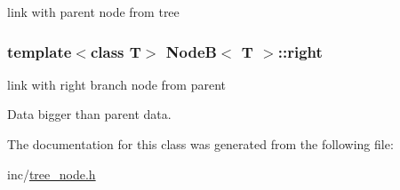 link with parent node from tree 

\hypertarget{class_node_b_a91e0cdfcaf563461d96079054627ced4}{}
\subsubsection[{right}]{\setlength{\rightskip}{0pt plus 5cm}template$<$class T$>$ {\bf Node\+B}$<$ T $>$\+::right\hspace{0.3cm}{\ttfamily [private]}}\label{class_node_b_a91e0cdfcaf563461d96079054627ced4}


link with right branch node from parent 

Data bigger than parent data. 

The documentation for this class was generated from the following file\+:\begin{DoxyCompactItemize}
\item 
inc/\hyperlink{tree__node_8h}{tree\+\_\+node.\+h}\end{DoxyCompactItemize}
